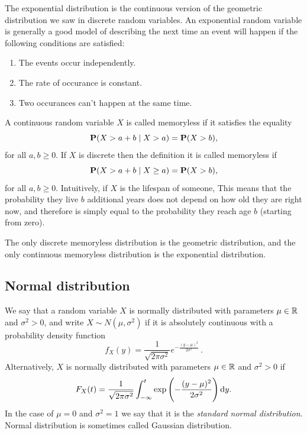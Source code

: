 \documentclass[11pt,a4paper]{article}
\begin{document}
\begin{remark}
  The exponential distribution is the continuous version of the geometric
  distribution we saw in discrete random variables.
  An exponential random variable is generally a good model of
  describing the next time an event will
  happen if the following conditions are satisfied:
  \begin{enumerate}
    \item[(1)] The events occur independently.
    \item[(2)] The rate of occurance is constant.
    \item[(3)] Two occurances can't happen at the same time.
  \end{enumerate}
\end{remark}

\begin{definition}[Memorylessness]
  A continuous
  random variable $X$ is called memoryless if it satisfies the equality
  \[
    \mathbf{P}(X > a + b \mid X > a) =
    \mathbf{P}(X > b),
  \]
  for all $a,b \geq 0$.
  If $X$ is discrete then the definition it is called memoryless if
  \[
    \mathbf{P}(X > a + b \mid X \geq a) =
    \mathbf{P}(X > b),
  \]
  for all $a,b \geq 0$.
  Intuitively, if $X$ is the lifespan of someone,
  This means that the probability they live $b$ additional years
  does not depend on how old they are right now,
  and therefore is simply equal to the probability they reach age $b$
  (starting from zero).
\end{definition}

\begin{remark}
  The only discrete memoryless distribution is the geometric distribution,
  and the only continuous memoryless distribution is the exponential
  distribution.
\end{remark}

\subsection{Normal distribution}
\begin{definition}
  We say that a random variable $X$ is normally distributed with parameters
  $\mu \in \mathbb{R}$ and $\sigma^2 > 0$, and write $X \sim N(\mu, \sigma^2)$
  if it is absolutely continuous with a probability density function
  \[
    f_X(y) = 
    \frac {1}{\sqrt {2\pi \sigma ^{2}}}
    e^{-{\frac {(y-\mu)^{2}}{2\sigma ^{2}}}}\,.
  \]
  Alternatively, $X$ is normally distributed with parameters $\mu \in \mathbb{R}$ and 
  $\sigma^2 > 0$ if
  \[
    F_X(t) = 
    \frac{1}{\sqrt{2\pi\sigma^{2}}}
    \int_{-\infty}^{t}
    \exp\left(-\frac{(y-\mu)^{2}}{2\sigma^{2}}\right) \dy.
  \]
  In the case of $\mu = 0$ and $\sigma^2 = 1$ we say that it is the 
  \textit{standard normal distribution}.
  Normal distribution is sometimes called Gaussian distribution.
\end{definition}
\end{document}

